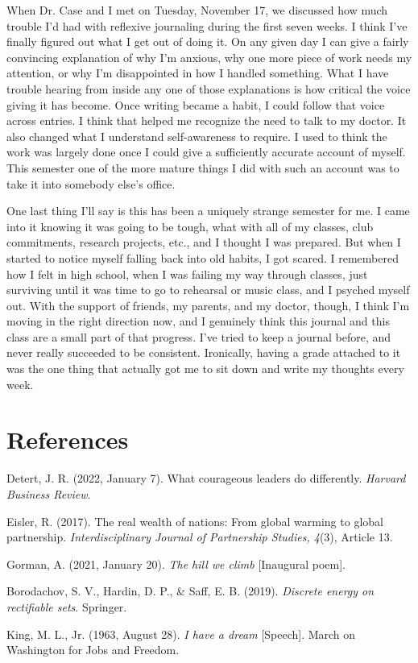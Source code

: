 \documentclass[12pt,letterpaper]{article}
\newcommand{\entry}[1]{\clearpage\section{#1}}
\begin{document}
When Dr. Case and I met on Tuesday, November 17, we discussed how much trouble I'd had with reflexive journaling during the first seven weeks. I think I've finally figured out what I get out of doing it. On any given day I can give a fairly convincing explanation of why I'm anxious, why one more piece of work needs my attention, or why I'm disappointed in how I handled something. What I have trouble hearing from inside any one of those explanations is how critical the voice giving it has become. Once writing became a habit, I could follow that voice across entries. I think that helped me recognize the need to talk to my doctor. It also changed what I understand self-awareness to require. I used to think the work was largely done once I could give a sufficiently accurate account of myself. This semester one of the more mature things I did with such an account was to take it into somebody else's office.

One last thing I'll say is this has been a uniquely strange semester for me.
I came into it knowing it was going to be tough, what with all of my classes, club commitments, research projects, etc., and I thought I was prepared.
But when I started to notice myself falling back into old habits, I got scared.
I remembered how I felt in high school, when I was failing my way through classes, just surviving until it was time to go to rehearsal or music class, and I psyched myself out.
With the support of friends, my parents, and my doctor, though, I think I'm moving in the right direction now, and I genuinely think this journal and this class are a small part of that progress.
I've tried to keep a journal before, and never really succeeded to be consistent.
Ironically, having a grade attached to it was the one thing that actually got me to sit down and write my thoughts every week.

\entry{References}
Detert, J. R. (2022, January 7). What courageous leaders do differently. \textit{Harvard Business Review}.

Eisler, R. (2017). The real wealth of nations: From global warming to global partnership. \textit{Interdisciplinary Journal of Partnership Studies, 4}(3), Article 13.

Gorman, A. (2021, January 20). \textit{The hill we climb} [Inaugural poem].

Borodachov, S. V., Hardin, D. P., \& Saff, E. B. (2019). \textit{Discrete energy on rectifiable sets}. Springer.

King, M. L., Jr. (1963, August 28). \textit{I have a dream} [Speech]. March on Washington for Jobs and Freedom.
\end{document}
